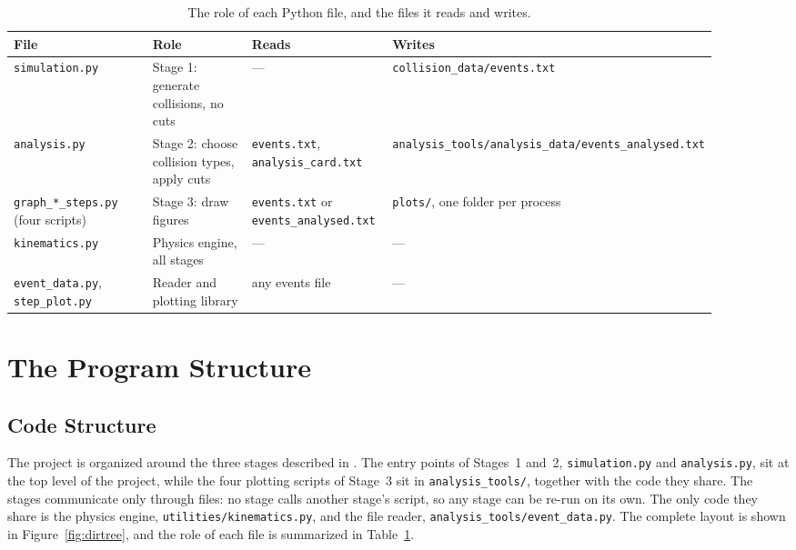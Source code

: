 \documentclass{article}
\begin{document}
\begin{table}[H]
\centering
\footnotesize
\begin{tabular}{p{0.25\linewidth} p{0.22\linewidth} p{0.21\linewidth} p{0.22\linewidth}}
\hline
File & Role & Reads & Writes \\
\hline
\texttt{simulation.py} & Stage 1: generate collisions, no cuts & --- & \texttt{collision\_data/\allowbreak events.txt} \\
\texttt{analysis.py} & Stage 2: choose collision types, apply cuts & \texttt{events.txt}, \texttt{analysis\_card.txt} & \texttt{analysis\_tools/\allowbreak analysis\_data/\allowbreak events\_analysed.txt} \\
\texttt{graph\_*\_steps.py} (four scripts) & Stage 3: draw figures & \texttt{events.txt} or \texttt{events\_analysed.txt} & \texttt{plots/}, one folder per process \\
\texttt{kinematics.py} & Physics engine, all stages & --- & --- \\
\texttt{event\_data.py}, \texttt{step\_plot.py} & Reader and plotting library & any events file & --- \\
\hline
\end{tabular}
\caption{The role of each Python file, and the files it reads and writes.}
\label{tab:modules}
\end{table}

\section{The Program Structure}
\label{sec:program_structure}

\subsection{Code Structure}
\label{ssec:code_structure}
The project is organized around the three stages described in . The entry points of Stages~1 and~2, \texttt{simulation.py} and \texttt{analysis.py}, sit at the top level of the project, while the four plotting scripts of Stage~3 sit in \texttt{analysis\_tools/}, together with the code they share. The stages communicate only through files: no stage calls another stage's script, so any stage can be re-run on its own. The only code they share is the physics engine, \texttt{utilities/\allowbreak kinematics.py}, and the file reader, \texttt{analysis\_tools/\allowbreak event\_data.py}. The complete layout is shown in Figure~\ref{fig:dirtree}, and the role of each file is summarized in Table~\ref{tab:modules}.
\end{document}
